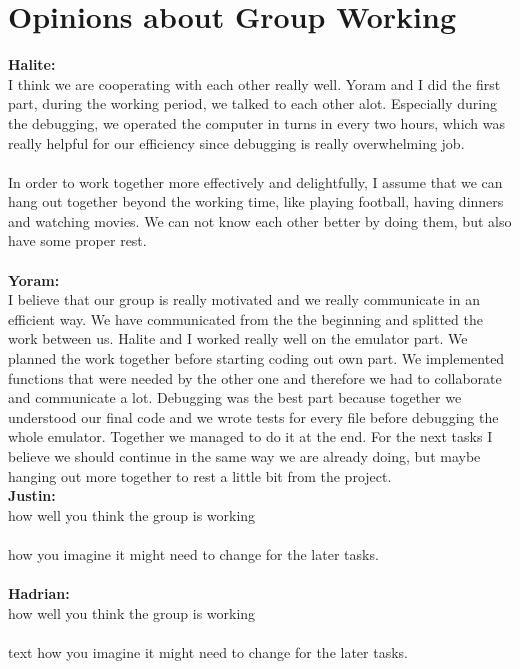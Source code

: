 \documentclass[a4paper]{article}
\begin{document}
\section{Opinions about Group Working}
\textbf{Halite:}\\
I think we are cooperating with each other really well. Yoram and I did the first part, during the working period, we talked to each other alot. Especially during the debugging, we operated the computer in turns in every two hours, which was really helpful for our efficiency since debugging is really overwhelming job.\\\\
In order to work together more effectively and delightfully, I assume that we can hang out together beyond the working time, like playing football, having dinners and watching movies. We can not know each other better by doing them, but also have some proper rest.\\
\\
\textbf{Yoram:}\\
I believe that our group is really motivated and we really communicate in an efficient way. We have communicated from the the beginning and splitted the work between us.
Halite and I worked really well on the emulator part. We planned the work together before starting coding out own part. We implemented functions that were needed by the other one and therefore we had to collaborate and communicate a lot.
Debugging was the best part because together we understood our final code and we wrote tests for every file before debugging the whole emulator. Together we managed to do it at the end.
For the next tasks I believe we should continue in the same way we are already doing, but maybe hanging out more together to rest a little bit from the project.
\\
\textbf{Justin:}\\
 how well you think the group is working
\\\\
how you imagine it might need to change for the later tasks.\\
\\
\textbf{Hadrian:}\\
 how well you think the group is working
\\\\
text
how you imagine it might need to change for the later tasks.
\end{document}
